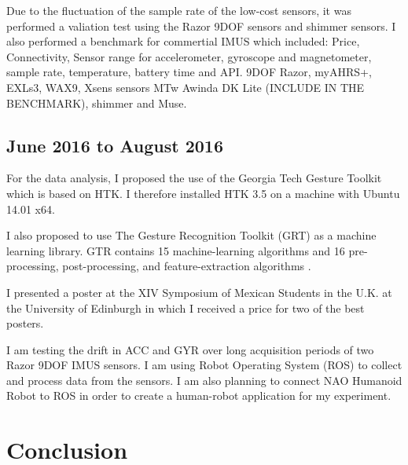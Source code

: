 \documentclass[12pt,journal,onecolumn,compsoc]{IEEEtran}
\begin{document}
Due to the fluctuation of the sample rate of the low-cost sensors,
it was performed a valiation test using the Razor 9DOF sensors and shimmer sensors.
I also performed a benchmark for commertial IMUS which included:
Price, Connectivity, Sensor range for accelerometer, gyroscope and magnetometer, 
sample rate, temperature, battery time and API.
9DOF Razor, myAHRS+, EXLs3, WAX9,
Xsens sensors MTw Awinda DK Lite (INCLUDE IN THE BENCHMARK),
shimmer and Muse.





\subsection{June 2016 to August 2016}

For the data analysis, I proposed the use of the Georgia Tech Gesture Toolkit which is based on HTK.
I therefore installed HTK 3.5 on a machine with Ubuntu 14.01 x64.

I also proposed to use The Gesture Recognition Toolkit (GRT) as a machine learning library.
GTR contains 15 machine-learning algorithms and 16 pre-processing, post-processing, and feature-extraction algorithms 
\cite{Gillian2014}.

I presented a poster at the XIV Symposium of Mexican Students in the U.K. at the University of Edinburgh
in which I received a price for two of the best posters.

I am testing the drift in ACC and GYR over long acquisition periods of two Razor 9DOF IMUS sensors. 
I am using Robot Operating System (ROS) to collect and process data from the sensors.
I am also planning to connect NAO Humanoid Robot to ROS in order to create
a human-robot application for my experiment.




\section{Conclusion}
\end{document}
